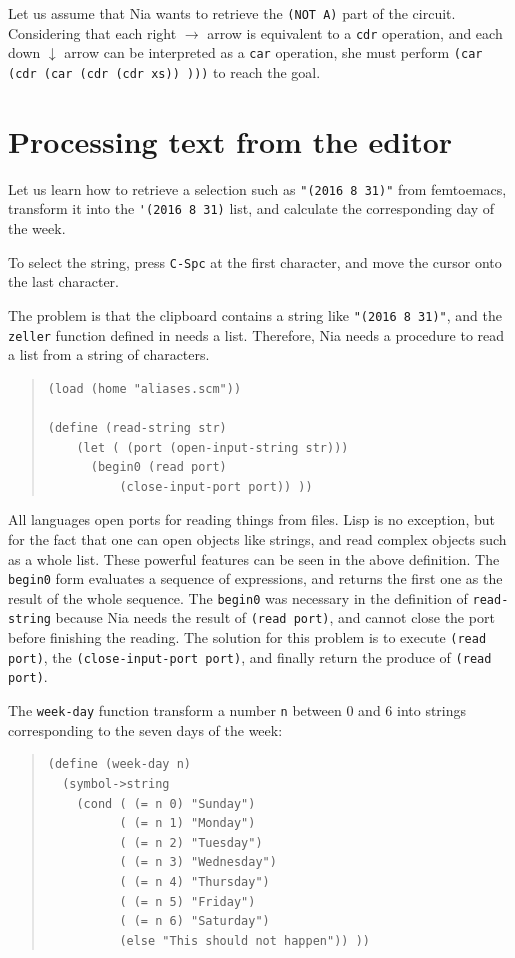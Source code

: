 \documentclass[a4paper,12pt]{book}
\begin{document}
Let us assume that Nia wants to retrieve the
\verb|(NOT A)| part of the circuit. Considering
that each right $\rightarrow$ arrow is equivalent
to a \verb|cdr| operation, and each down $\downarrow$
arrow can be interpreted as a \verb|car| operation,
she must perform \verb|(car (cdr (car (cdr (cdr xs)) )))|
to reach the goal.


\section{Processing text from the editor}
Let us learn how to retrieve a selection such as
\verb|"(2016 8 31)"| from femtoemacs,
transform it into the \verb|'(2016 8 31)|
list, and calculate the corresponding
day of the week.

To select the string, press \verb|C-Spc|
at the first character, and
move the cursor onto the last character.

The problem is that the clipboard
contains a string like \verb|"(2016 8 31)"|, and
the \verb|zeller| function defined in needs a list.
Therefore, Nia needs a procedure to
read a list from a string of characters.

\begin{quote}
\begin{verbatim}
(load (home "aliases.scm"))

(define (read-string str)
    (let ( (port (open-input-string str)))
      (begin0 (read port)
	      (close-input-port port)) ))
\end{verbatim}
\end{quote}

All languages open ports for reading things
from files. Lisp is no exception, but for
the fact that one can open objects like
strings, and read complex objects such
as a whole list. These powerful features
can be seen in the above definition.
The \verb|begin0| form evaluates a sequence
of expressions, and returns the first
one as the result of the whole sequence.
The \verb|begin0| was necessary in the 
definition of \verb|read-string| because
Nia needs the result of \verb|(read port)|,
and cannot close the port before finishing
the reading. The solution for this problem
is to execute \verb|(read port)|, 
the \verb|(close-input-port port)|, and
finally return the produce of \verb|(read port)|.

The \verb|week-day| function transform
a number \verb|n| between 0 and 6 into
strings corresponding to the seven
days of the week:
\begin{quote}
\begin{verbatim}
(define (week-day n)
  (symbol->string
    (cond ( (= n 0) "Sunday")
          ( (= n 1) "Monday")
          ( (= n 2) "Tuesday")
          ( (= n 3) "Wednesday")
          ( (= n 4) "Thursday")
          ( (= n 5) "Friday")
          ( (= n 6) "Saturday")
          (else "This should not happen")) ))
\end{verbatim}
\end{quote}
\end{document}
